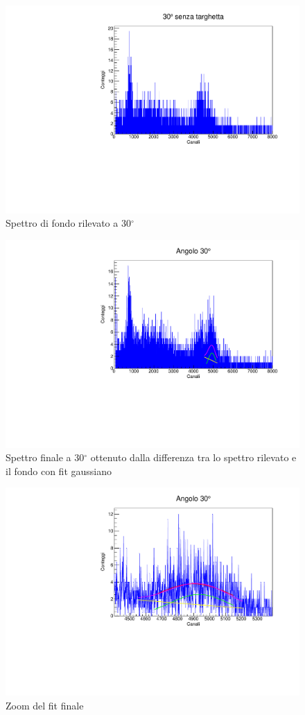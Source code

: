 \documentclass[italian,11pt]{report}
\begin{document}
\begin{figure}[!htp]
\centering
\includegraphics[width=12cm]{30notarghet.pdf}
\caption{Spettro di fondo rilevato a 30$^\circ$}
\end{figure}
\begin{figure}[!htp]
\centering
\includegraphics[width=12cm]{30finale.pdf}
\caption{Spettro finale a 30$^\circ$ ottenuto dalla differenza tra lo spettro rilevato e il fondo con fit gaussiano}
\end{figure}
\begin{figure}[!htp]
\centering
\includegraphics[width=12cm]{30zoom.pdf}
\caption{Zoom del fit finale}
\end{figure}
\end{document}

